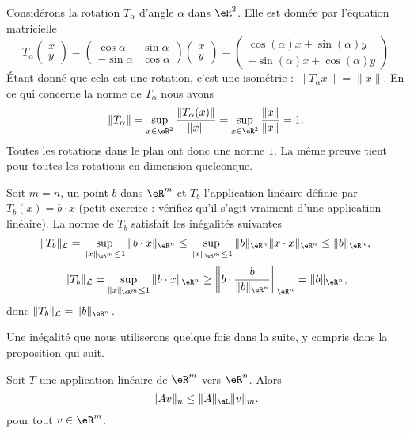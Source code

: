 \begin{example}
	Considérons la rotation $T_{\alpha}$ d'angle $\alpha$ dans $\eR^2$. Elle est donnée par l'équation matricielle
	\begin{equation}
		T_{\alpha}\begin{pmatrix}
			x	\\ 
			y	
		\end{pmatrix}=\begin{pmatrix}
			\cos\alpha	&	\sin\alpha	\\ 
			-\sin\alpha	&	\cos\alpha	
		\end{pmatrix}\begin{pmatrix}
			x	\\ 
			y	
		\end{pmatrix}=\begin{pmatrix}
			\cos(\alpha)x+\sin(\alpha)y	\\ 
			-\sin(\alpha)x+\cos(\alpha)y	
		\end{pmatrix}
	\end{equation}
	Étant donné que cela est une rotation, c'est une isométrie : $\| T_{\alpha}x \|=\| x \|$. En ce qui concerne la norme de $T_{\alpha}$ nous avons
	\begin{equation}
		\| T_{\alpha} \|=\sup_{x\in\eR^2}\frac{ \| T_{\alpha}(x) \| }{ \| x \| }=\sup_{x\in\eR^2}\frac{ \| x \| }{ \| x \| }=1.
	\end{equation}
	Toutes les rotations dans le plan ont donc une norme $1$. La même preuve tient pour toutes les rotations en dimension quelconque. 
\end{example}


\begin{example}
  Soit $m=n$, un point $b$ dans $\eR^m$ et $T_b$ l'application linéaire définie par $T_b(x)=b\cdot x$ (petit exercice : vérifiez qu'il s'agit vraiment d'une application linéaire).  La norme de $T_b$ satisfait les inégalités suivantes 
 \[
\|T_b\|_{\mathcal{L}}=\sup_{\|x\|_{\eR^m}\leq 1}\|b\cdot x\|_{\eR^n}\leq \sup_{\|x\|_{\eR^m}\leq 1}\|b \|_{\eR^n}\|x\cdot x\|_{\eR^n}\leq\|b \|_{\eR^n},
\]
\[
\|T_b\|_{\mathcal{L}}=\sup_{\|x\|_{\eR^m}\leq 1}\|b\cdot x\|_{\eR^n}\geq \left\|b\cdot \frac{b}{\|b \|_{\eR^n}}\right\|_{\eR^n}=\|b \|_{\eR^n},
\]
donc $\|T_b\|_{\mathcal{L}}=\|b \|_{\eR^n}$.
\end{example}

Une inégalité que nous utiliserons quelque fois dans la suite, y compris dans la proposition qui suit.
\begin{lemma}		\label{LemAvmajAfoisv}
	Soit $T$ une application linéaire de $\eR^m$ vers $\eR^n$. Alors
	\begin{equation}
		\| Av \|_n\leq \| A \|_{\aL}\| v \|_m.
	\end{equation}
	pour tout $v\in\eR^m$.
\end{lemma}

